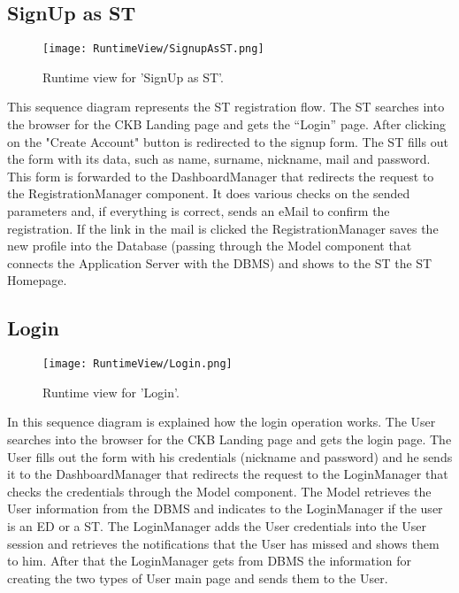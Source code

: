 \subsection{SignUp as ST}
\begin{figure}[H]
    \begin{center}
        \texttt{[image: RuntimeView/SignupAsST.png]}
        \caption{Runtime view for 'SignUp as ST'.}
        \label{fig:runtime_signupasST}%
    \end{center}
\end{figure}

This sequence diagram represents the ST registration flow.
The ST searches into the browser for the CKB Landing page and gets the “Login” page.
After clicking on the "Create Account" button is redirected to the signup form.
The ST fills out the form with its data, such as name, surname, nickname, mail and password. 
This form is forwarded to the DashboardManager that redirects the request to the RegistrationManager component. It does various checks on the sended parameters and, if everything is correct, sends an eMail to confirm the registration.
If the link in the mail is clicked the RegistrationManager saves the new profile into the Database (passing through the Model component that connects the Application Server with the DBMS) and shows to the ST the ST Homepage.

\subsection{Login}
\begin{figure}[H]
    \begin{center}
        \texttt{[image: RuntimeView/Login.png]}
        \caption{Runtime view for 'Login'.}
        \label{fig:runtime_login}%
    \end{center}
\end{figure}
In this sequence diagram is explained how the login operation works.
The User searches into the browser for the CKB Landing page and gets the login page.
The User fills out the form with his credentials (nickname and password) and he sends it to the DashboardManager that redirects the request to the LoginManager that checks the credentials through the Model component.
The Model retrieves the User information from the DBMS and indicates to the LoginManager if the user is an ED or a ST.
The LoginManager adds the User credentials into the User session and retrieves the notifications that the User has missed and shows them to him.
After that the LoginManager gets from DBMS the information for creating the two types of User main page and sends them to the User.


